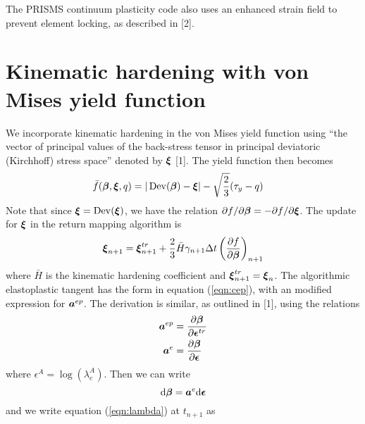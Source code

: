 \documentclass[10pt]{article}
\begin{document}
The PRISMS continuum plasticity code also uses an enhanced strain field to prevent element locking, as described in [2].

\section{Kinematic hardening with von Mises yield function}
We incorporate kinematic hardening in the von Mises yield function using ``the vector of principal values of the back-stress tensor in principal deviatoric (Kirchhoff) stress space'' denoted by $\mbox{\boldmath$\xi$}$ [1]. The yield function then becomes
\begin{align}
\bar{f}(\mbox{\boldmath$\beta$},\mbox{\boldmath$\xi$},q) &= |\mathop{\rm Dev}\nolimits(\mbox{\boldmath$\beta$})-\mbox{\boldmath$\xi$}| - \sqrt{\frac{2}{3}}(\tau_y - q)
\end{align}
Note that since $\mbox{\boldmath$\xi$} = \mathop{\rm Dev}\nolimits(\mbox{\boldmath$\xi$})$, we have the relation $\partial f/\partial\mbox{\boldmath$\beta$} = -\partial f/\partial\mbox{\boldmath$\xi$}$. The update for $\mbox{\boldmath$\xi$}$ in the return mapping algorithm is
\begin{align}
\mbox{\boldmath$\xi$}_{n+1} = \mbox{\boldmath$\xi$}^{tr}_{n+1} + \frac{2}{3}\bar{H}\gamma_{n+1}\Delta t\left(\frac{\partial f}{\partial\mbox{\boldmath$\beta$}}\right)_{n+1}
\label{eqn:xi}
\end{align}
where $\bar{H}$ is the kinematic hardening coefficient and $\mbox{\boldmath$\xi$}^{tr}_{n+1} = \mbox{\boldmath$\xi$}_{n}$. The algorithmic elastoplastic tangent has the form in equation (\ref{eqn:cep}), with an modified expression for $\mbox{\boldmath$ a$}^{ep}$. The derivation is similar, as outlined in [1], using the relations
\begin{equation}
\begin{aligned}
\mbox{\boldmath$ a$}^{ep} &= \frac{\partial \mbox{\boldmath$\beta$}}{\partial \mbox{\boldmath$\epsilon$}^{tr}}\\
\mbox{\boldmath$ a$}^{e} &= \frac{\partial \mbox{\boldmath$\beta$}}{\partial \mbox{\boldmath$\epsilon$}}
\end{aligned}
\end{equation}
where $\epsilon^A = \log(\lambda^A_e)$.
Then we can write
\begin{equation}
\mathrm{d}\mbox{\boldmath$\beta$} = \mbox{\boldmath$ a$}^e\mathrm{d}\mbox{\boldmath$\epsilon$}
\label{eqn:dbeta}
\end{equation}
and we write equation (\ref{eqn:lambda}) at $t_{n+1}$ as
\end{document}
